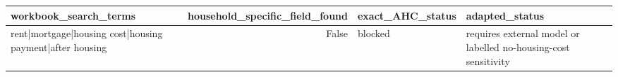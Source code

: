 \begin{tabular}{lrll}
\toprule
workbook_search_terms & household_specific_field_found & exact_AHC_status & adapted_status \\
\midrule
rent|mortgage|housing cost|housing payment|after housing & False & blocked & requires external model or labelled no-housing-cost sensitivity \\
\bottomrule
\end{tabular}
